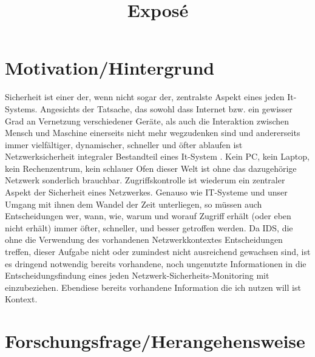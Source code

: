 \documentclass[11pt]{article} %
\title{Exposé}
\begin{document}
\maketitle
\renewcommand{\labelenumii}{\arabic{enumi}.\arabic{enumii}}
\renewcommand{\labelenumiii}{\arabic{enumi}.\arabic{enumii}.\arabic{enumiii}}
\renewcommand{\labelenumiv}{\arabic{enumi}.\arabic{enumii}.\arabic{enumiii}.\arabic{enumiv}}

\section{Motivation/Hintergrund}
Sicherheit ist einer der, wenn nicht sogar der, zentralste Aspekt eines jeden It-Systems. Angesichts der Tatsache, das sowohl dass Internet bzw. ein gewisser Grad an Vernetzung verschiedener Geräte, als auch die Interaktion zwischen Mensch und Maschine einerseits nicht mehr wegzudenken sind und andererseits immer vielfältiger, dynamischer, schneller und öfter ablaufen ist Netzwerksicherheit integraler Bestandteil eines It-System . Kein PC, kein Laptop, kein Rechenzentrum, kein schlauer Ofen dieser Welt ist ohne das dazugehörige Netzwerk sonderlich brauchbar. Zugriffskontrolle ist wiederum ein zentraler Aspekt der Sicherheit eines Netzwerkes. Genauso wie IT-Systeme und unser Umgang mit ihnen dem Wandel der Zeit unterliegen, so müssen auch Entscheidungen wer, wann, wie, warum und worauf Zugriff erhält (oder eben nicht erhält) immer öfter, schneller, und besser getroffen werden. Da IDS, die ohne die Verwendung des vorhandenen Netzwerkkontextes Entscheidungen treffen, dieser Aufgabe nicht oder zumindest nicht ausreichend gewachsen sind, ist es dringend notwendig bereits vorhandene, noch ungenutzte Informationen in die Entscheidungsfindung eines jeden Netzwerk-Sicherheits-Monitoring mit einzubeziehen.
Ebendiese bereits vorhandene Information die ich nutzen will ist Kontext.
 
\section{Forschungsfrage/Herangehensweise} 
\end{document}
